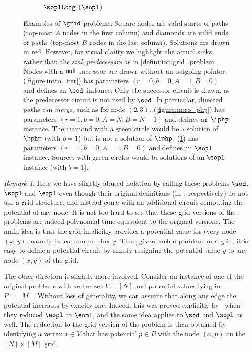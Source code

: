 \documentclass[10pt,a4paper]{article}
\theoremstyle{definition}
\theoremstyle{plain}
\theoremstyle{remark}
\newtheorem{remark}{Remark}
\newcommand{\nul}{\textup{\textsf{null}}}
\begin{document}
\begin{figure}[t]
\begin{subfigure}[b]{0.33\textwidth}
    \vspace{2mm}
    \caption{$\soplLong$ ($\sopl$)}
    \label{figure:intro_sopl}
\end{subfigure}
\caption{Examples of $\grid$ problems. Square nodes are valid starts of paths (top-most $A$ nodes in the first column) and diamonds are valid ends of paths (top-most $B$ nodes in the last column). Solutions are drawn in red. However, for visual clarity we highlight the actual sinks rather than the \emph{sink predecessors} as in \cref{definition:grid_problem}. Nodes with a $\nul$ successor are drawn without an outgoing pointer.
(\ref{figure:intro_iter}) has parameters $(r = 0, b = 0, A=1, B=0)$ and defines an $\sod$ instance. Only the successor circuit is drawn, as the predecessor circuit is not used by $\sod$. In particular, directed paths can \emph{merge}, such as for node $(2, 3)$.
(\ref{figure:intro_php}) has parameters $(r=1, b=0, A=N, B=N-1)$ and defines an $\iphp$ instance. The diamond with a green circle would be a solution of $\bphp$ (with $b=1$) but is not a solution of $\iphp$.
(\ref{figure:intro_sopl}) has parameters $(r =1, b= 0, A=1, B=0)$ and defines an $\sopl$ instance. Sources with green circles would be solutions of an $\eopl$ instance (with $b=1$).
}
\label{figure:grid_problem_summary}
\end{figure}



\begin{remark}
Here we have slightly abused notation by calling these problems $\sod$, $\sopl$ and $\eopl$ even though their original definitions (in~\cite{Johnson1988,Goos2018,Fearnley2020}, respectively) do not use a grid structure, and instead come with an additional circuit computing the potential of any node. It is not too hard to see that these grid-versions of the problems are indeed polynomial-time equivalent to the original versions. The main idea is that the grid implicitly provides a potential value for every node $(x,y)$, namely its column number $y$. Thus, given such a problem on a grid, it is easy to define a potential circuit by simply assigning the potential value $y$ to any node $(x,y)$ of the grid.

The other direction is slightly more involved. Consider an instance of one of the original problems with vertex set $V = [N]$ and potential values lying in $P = [M]$. Without loss of generality, we can assume that along any edge the potential increases by exactly one. Indeed, this was proved explicitly by~\cite{Fearnley2020} when they reduced $\eopl$ to $\eoml$, and the same idea applies to $\sod$ and $\sopl$ as well. The reduction to the grid-version of the problem is then obtained by identifying a vertex $x \in V$ that has potential $p \in P$ with the node $(x,p)$ on the $[N] \times [M]$ grid.
\end{remark}
\end{document}
